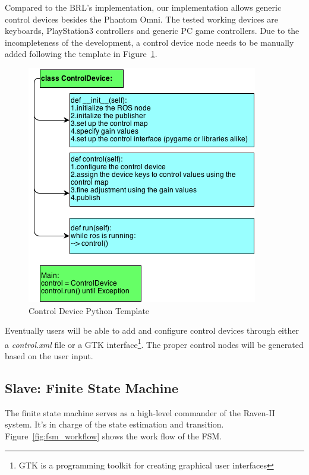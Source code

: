 \documentclass[letterpaper,twocolumn,10pt]{article}
\begin{document}
Compared to the BRL's implementation, our implementation allows
generic control devices besides the Phantom Omni. The tested working
devices are keyboards, PlayStation3 controllers and generic PC game
controllers. Due to the incompleteness of the development, a control
device node needs to be manually added following the template in
Figure~\ref{fig:control_device_template}.

\begin{figure}[h!]
  \includegraphics[width=1.0\columnwidth]{ControlDeviceTemplate.png}
  \caption{Control Device Python Template}
  \label{fig:control_device_template}
\end{figure}

Eventually users will be able to add and configure control devices
through either a \emph{control.xml} file or a GTK
interface\footnote{GTK is a programming toolkit for creating graphical
  user interfaces}. The proper control nodes will be generated based
on the user input.

\subsection{Slave: Finite State Machine}

The finite state machine serves as a high-level commander of the
Raven-II system. It's in charge of the state estimation and
transition. Figure~\ref{fig:fsm_workflow} shows the work flow of the FSM.
\end{document}

